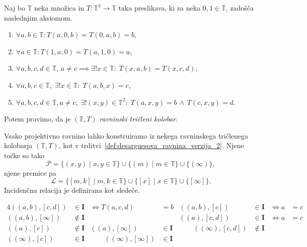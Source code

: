 \documentclass[fin1, tisk]{fmfdelo}
\newcommand{\R}{\mathbb{T}}
\newcommand{\II}{\mathbf{I}}
\newcommand{\PP}{\mathcal{P}}
\newcommand{\LL}{\mathcal{L}}
\begin{document}
\begin{definicija}\label{def:planarni_ternarni_obroc}
    Naj bo $\R$ neka množica in $T: \R^3 \to \R$ taka preslikava, ki za neka
    $0,1\in\R$, zadošča naslednjim aksiomom.
    \begin{enumerate}[label=(\roman*)]
        \item $\forall a, b \in \R: T(a, 0, b) = T(0, a, b) = b$,\label{it:t1}
        \item $\forall a \in \R: T(1, a, 0) = T(a, 1, 0) = a$,\label{it:t2}
        \item $\forall a, b, c, d \in \R,\, a \neq c \implies \exists! x \in \R:\; T(x, a, b) = T(x, c, d)$,\label{it:t3}
        \item $\forall a, b, c \in \R,\; \exists! x\in \R:\; T(a, b, x) = c$,\label{it:t4}
        \item $\forall a, b, c, d\in \R, a\neq c, \;\exists! (x, y) \in \R^2:\; T(a, x, y) = b\,\land\,T(c, x, y) = d$\label{it:t5}.
    \end{enumerate}
    Potem pravimo, da je $(\R, T)$ \emph{ravninski tričleni kolobar}. 
\end{definicija}

\begin{trditev}
    Vsako projektivno ravnino lahko konstruiramo iz nekega ravninskega tričlenega kolobarja $(\R, T)$, 
    kot v trditvi~\ref{def:desarguesova_ravnina_verzija_2}. Njene točke so tako
    $$\PP = \{(x, y) \mid x, y \in \R\} \cup \{(m) \mid m \in \R\} \cup \{(\infty)\},$$
    njene premice pa $$\LL = \{[m, k] \mid m, k \in \R\} \cup \{[x] \mid x \in \R\} \cup \{[\infty]\}.$$
    Incidenčna relacija je definirana kot sledeče.

    \begin{alignat*}{4}
        ((a,b),[c,d])&\in \II &\iff T(a,c,d)&=b &
        ((a, b), [c])&\in\II &\iff a &= c \\
        ((a, b), [\infty])&\not\in\II &&&
        ((a), [c, d])&\in\II &\iff a &= c \\
        ((a), [c])&\not\in\II &
        ((a), [\infty])&\in\II &\qquad
        ((\infty), [c, d])&\not\in\II \\
        ((\infty), [c])&\in\II &\qquad
        ((\infty), [\infty])&\in\II
    \end{alignat*}
\end{trditev}
\end{document}
